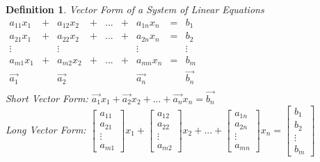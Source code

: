 \documentclass[a4paper,12pt,openany]{book}
\theoremstyle{defn}
\newtheorem{defn}{Definition}[section]
\theoremstyle{expl}
\begin{document}
\begin{defn}
\textup{
Vector Form of a System of Linear Equations\\
$\begin{array}{ccccccccc}
a_{11}x_1&+&a_{12}x_2&+&...&+&a_{1n}x_n &=&b_1\\
a_{21}x_1&+&a_{22}x_2&+&...&+&a_{2n}x_n &=&b_2\\
\vdots&&\vdots&&&&\vdots&&\vdots\\
a_{m1}x_1&+&a_{m2}x_2&+&...&+&a_{mn}x_n&=& b_m\\
\vec{a_1}&&\vec{a_2}&&&&\vec{a_n}&&\vec{b_n}\\
\end{array}$\\
Short Vector Form: $\vec{a_1}x_1+\vec{a_2}x_2+...+\vec{a_n}x_n=\vec{b_n}$\\
Long Vector Form: $\left[\begin{array}{c} a_{11}\\a_{21}\\\vdots\\a_{m1}\end{array}\right]x_1
+\left[\begin{array}{c} a_{12}\\a_{22}\\\vdots\\a_{m2}\end{array}\right]x_2+...
+\left[\begin{array}{c} a_{1n}\\a_{2n}\\\vdots\\a_{mn}\end{array}\right]x_n
=\left[\begin{array}{c} b_{1}\\b_{2}\\\vdots\\b_{m}\end{array}\right]$
}\end{defn}
\end{document}
